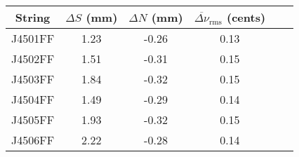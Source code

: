 \begin{tabular}{cccccc}
\toprule
String & $\Delta S$ (mm) & $\Delta N$ (mm) & $\overline{\Delta \nu}_\text{rms}$ (cents) \\
\midrule
J4501FF & 1.23 & -0.26 & 0.13 \\
J4502FF & 1.51 & -0.31 & 0.15 \\
J4503FF & 1.84 & -0.32 & 0.15 \\
J4504FF & 1.49 & -0.29 & 0.14 \\
J4505FF & 1.93 & -0.32 & 0.15 \\
J4506FF & 2.22 & -0.28 & 0.14 \\
\bottomrule
\end{tabular}

